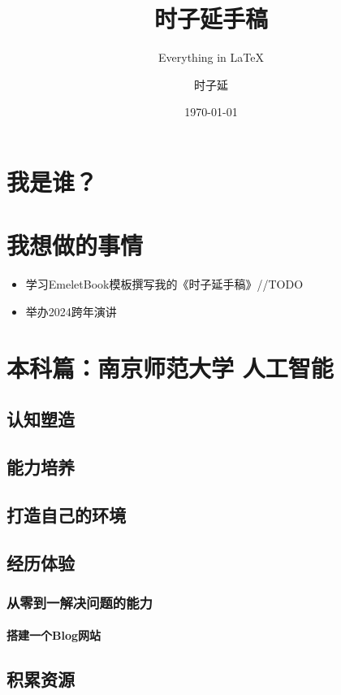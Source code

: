\documentclass[lang=cn,newtx,10pt,color=green,scheme=chinese]{elegantbook}
\title{时子延手稿}
\subtitle{Everything in \LaTeX{}}
\author{时子延}
\institute{认知与意识智能学习研究中心}
\date{\today}
\begin{document}
\maketitle
\frontmatter

\tableofcontents

\mainmatter

\chapter{我是谁？}


\chapter{我想做的事情}

\begin{itemize}
    \item 学习EmeletBook模板撰写我的《时子延手稿》//TODO
    \item 举办2024跨年演讲
\end{itemize}


\chapter{本科篇：南京师范大学 人工智能}
\section{认知塑造}



\section{能力培养}
\section{打造自己的环境}
\section{经历体验}
\subsection{从零到一解决问题的能力}
\subsubsection{搭建一个Blog网站}
\section{积累资源}
\end{document}
